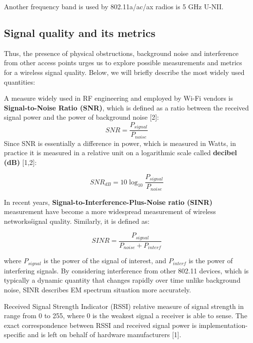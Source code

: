 Another frequency band is used by 802.11a/ac/ax radios is 5 GHz U-NII.

\subsection{Signal quality and its metrics}

Thus, the presence of physical obstructions, background noise and interference from other access points urges us to explore possible measurements and metrics for a wireless signal quality. Below, we will briefly describe the most widely used quantities:

A measure widely used in RF engineering and employed by Wi-Fi vendors is \textbf{Signal-to-Noise Ratio (SNR)}, which is defined as a ratio between the received signal power and the power of background noise [2]:
\begin{equation}
    \label{formula:snr}
    SNR = \frac{P_{signal}}{P_{noise}}
\end{equation}
    Since SNR is essentially a difference in power, which is measured in Watts, in practice it is measured in a relative unit on a logarithmic scale called \textbf{decibel (dB)} [1,2]:

\begin{equation}
    \label{formula:snr_db}
    {SNR}_{dB} = 10\log_{10}\frac{P_{signal}}{P_{noise}}
\end{equation}

In recent years, \textbf{Signal-to-Interference-Plus-Noise ratio (SINR)} measurement have become a more widespread measurement of wireless networks\' signal quality. Similarly, it is defined as:

\begin{equation}
    \label{formula:sinr}
    SINR = \frac{P_{signal}}{P_{noise} + P_{interf}}
\end{equation}

    where $P_{signal}$ is the power of the signal of interest, and $P_{interf}$ is the power of interfering signals.
    By considering interference from other 802.11 devices, which is typically a dynamic quantity that changes rapidly over time unlike background noise, SINR describes EM spectrum situation more accurately.

Received Signal Strength Indicator (RSSI) relative measure of signal strength in range from 0 to 255, where 0 is the weakest signal a receiver is able to sense. The exact correspondence between RSSI and received signal power is implementation-specific and is left on behalf of hardware manufacturers [1].

